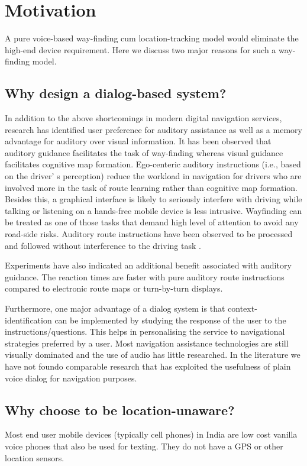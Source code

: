 \documentclass{iitkthesis}
\begin{document}
\section{Motivation}
A pure voice-based way-finding cum location-tracking 
model would eliminate the high-end device requirement. Here we discuss two
major reasons for such a way-finding model. 
\subsection{Why design a dialog-based system?}
In addition to the above shortcomings in modern digital navigation 
services, research \cite{jensen2010,dalton,reagan2006} has 
identified user preference for auditory assistance as well as a memory 
advantage for auditory over visual information. It has been observed 
\cite{baldwin2009,furukawa2004} that auditory guidance facilitates the 
task of way-finding whereas visual guidance facilitates cognitive map 
formation. Ego-centeric auditory instructions (i.e., based on the driver'
s perception) reduce the workload in navigation for drivers who are 
involved more in the task of route learning rather than cognitive map 
formation. Besides this, a graphical interface is likely to seriously 
interfere with driving while talking or listening on a hands-free mobile 
device is less intrusive. Wayfinding 
can be treated as one of those tasks that demand high level of attention 
to avoid any road-side risks. Auditory route instructions have been 
observed to be processed and followed without interference to the driving 
task \cite{jensen2010,dalton}.

Experiments \cite{srinivasaneffect} have also indicated an additional 
benefit associated with auditory guidance. The reaction times are 
faster with pure auditory route instructions compared to electronic 
route maps or turn-by-turn displays. 

Furthermore,  one major advantage of a dialog system 
is that context-identification can be implemented by studying the 
response of the user to the instructions/questions. This helps in 
personalising the service to navigational 
strategies preferred by a user. Most navigation assistance 
technologies are still visually dominated and the use of audio has 
little researched. In the literature we have not foundo comparable research 
that has exploited the usefulness of plain voice dialog for 
navigation purposes.
\subsection{Why choose to be location-unaware?}
Most end user mobile devices (typically cell phones)  in India are low cost 
vanilla voice phones that also be used for texting. They do not have a GPS or
other location sensors.
\end{document}
